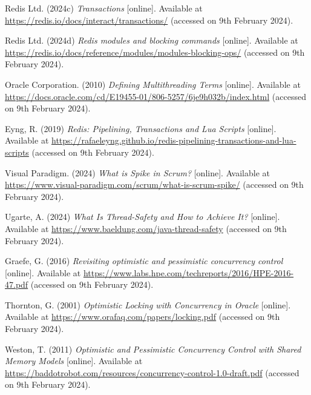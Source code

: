 \noindent Redis Ltd. (2024c) \textit{Transactions} [online]. Available at \url{https://redis.io/docs/interact/transactions/} (accessed on 9th February 2024).
\vspace{0.2cm}

\noindent Redis Ltd. (2024d) \textit{Redis modules and blocking commands} [online]. Available at \url{https://redis.io/docs/reference/modules/modules-blocking-ops/} (accessed on 9th February 2024).
\vspace{0.2cm}

\noindent Oracle Corporation. (2010) \textit{Defining Multithreading Terms} [online]. Available at \url{https://docs.oracle.com/cd/E19455-01/806-5257/6je9h032b/index.html} (accessed on 9th February 2024).
\vspace{0.2cm}

\noindent Eyng, R. (2019) \textit{Redis: Pipelining, Transactions and Lua Scripts} [online]. Available at \url{https://rafaeleyng.github.io/redis-pipelining-transactions-and-lua-scripts} (accessed on 9th February 2024).
\vspace{0.2cm}

\noindent Visual Paradigm. (2024) \textit{What is Spike in Scrum?} [online]. Available at \url{https://www.visual-paradigm.com/scrum/what-is-scrum-spike/} (accessed on 9th February 2024).
\vspace{0.2cm}

\noindent Ugarte, A. (2024) \textit{What Is Thread-Safety and How to Achieve It?} [online]. Available at \url{https://www.baeldung.com/java-thread-safety} (accessed on 9th February 2024).
\vspace{0.2cm}

\noindent Graefe, G. (2016) \textit{Revisiting optimistic and pessimistic concurrency control} [online]. Available at \url{https://www.labs.hpe.com/techreports/2016/HPE-2016-47.pdf} (accessed on 9th February 2024).
\vspace{0.2cm}

\noindent Thornton, G. (2001) \textit{Optimistic Locking with Concurrency in Oracle} [online]. Available at \url{https://www.orafaq.com/papers/locking.pdf} (accessed on 9th February 2024).
\vspace{0.2cm}

\noindent Weston, T. (2011) \textit{Optimistic and Pessimistic Concurrency Control with Shared Memory Models} [online]. Available at \url{https://baddotrobot.com/resources/concurrency-control-1.0-draft.pdf} (accessed on 9th February 2024).
\vspace{0.2cm}

